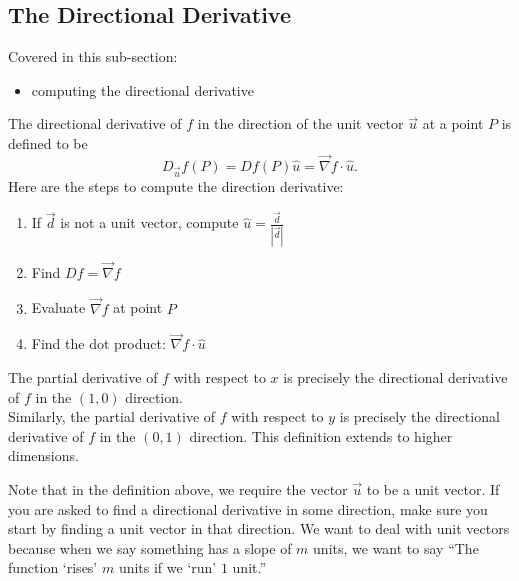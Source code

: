 
\subsection{The Directional Derivative}

Covered in this sub-section:
\begin{itemize}
	\item computing the directional derivative
\end{itemize}

\begin{definition}
The directional derivative of $f$ in the direction of the unit vector $\vec u$ at a point $P$ is defined to be
$$D_{\vec u} f(P) = Df(P) \hat u = \vec \nabla f \cdot \hat u.$$
Here are the steps to compute the direction derivative:\\
\begin{enumerate}
\item If $\vec{d}$ is not a unit vector, compute $\hat{u}=\frac{\vec{d}}{|\vec{d}|}$
\item Find $Df=\vec{\nabla} f$
\item Evaluate $\vec{\nabla} f$ at point $P$
\item Find the dot product:  $\vec \nabla f \cdot \hat u$
\end{enumerate}

The partial derivative of $f$ with respect to $x$ is precisely the directional derivative of $f$ in the $(1,0)$ direction. \\

Similarly, the partial derivative of $f$ with respect to $y$ is precisely the directional derivative of $f$ in the $(0,1)$ direction. This definition extends to higher dimensions.
\end{definition}

Note that in the definition above, we require the vector $\vec u$ to be a unit vector.  If you are asked to find a directional derivative in some direction, make sure you start by finding a unit vector in that direction. We want to deal with unit vectors because when we say something has a slope of $m$ units, we want to say ``The function `rises' $m$ units if we `run' $1$ unit.''  

